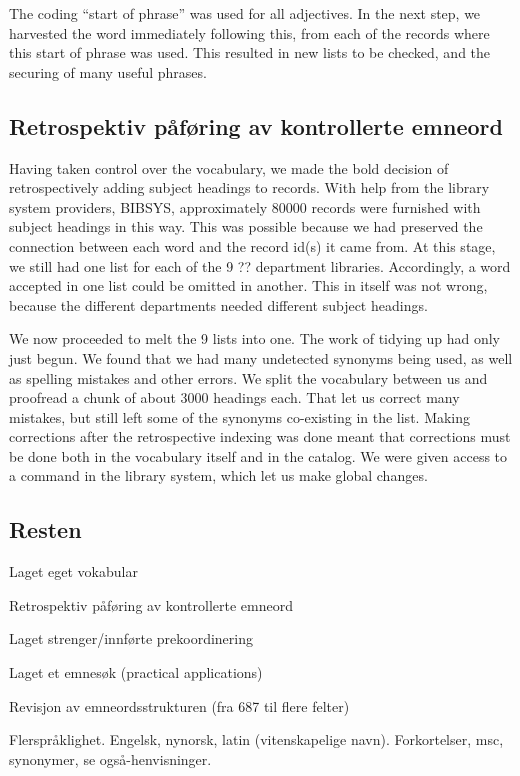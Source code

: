 The coding ``start of phrase'' was used for all adjectives. In the next step, we harvested the word immediately following this, from each of the records where this start of phrase was used. This resulted in new lists to be checked, and the securing of many useful phrases. 

\subsection{Retrospektiv påføring av kontrollerte emneord}

Having taken control over the vocabulary, we made the bold decision of retrospectively adding subject headings to records. With help from the library system providers, BIBSYS, approximately 80000 records were furnished with subject headings in this way. This was possible because we had preserved the connection between each word and the record id(s) it came from. At this stage, we still had one list for each of the 9 ?? department libraries. Accordingly, a word accepted in one list could be omitted in another. This in itself was not wrong, because the different departments needed different subject headings. 

We now proceeded to melt the 9 lists into one. The work of tidying up had only just begun. We found that we had many undetected synonyms being used, as well as spelling mistakes and other errors. We split the vocabulary between us and proofread a chunk of about 3000 headings each. That let us correct many mistakes, but still left some of the synonyms co-existing in the list. Making corrections after the retrospective indexing was done meant that corrections must be done both in the vocabulary itself and in the catalog. We were given access to a command in the library system, which let us make global changes. 

\subsection{Resten}

Laget eget vokabular

Retrospektiv påføring av kontrollerte emneord

Laget strenger/innførte prekoordinering

Laget et emnesøk (practical applications)

Revisjon av emneordsstrukturen (fra 687 til flere felter)

Flerspråklighet. Engelsk, nynorsk, latin (vitenskapelige navn). Forkortelser, msc, 
synonymer, se også-henvisninger. 


